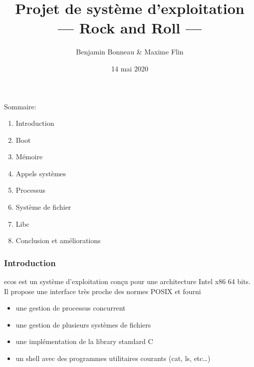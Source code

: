 \documentclass[10pt,a4paper]{beamer}
\author{Benjamin Bonneau \& Maxime Flin }
\title{Projet de système d'exploitation \\ --- Rock and Roll ---}
\date{14 mai 2020}
\begin{document}
\maketitle

\begin{frame}
  Sommaire:
  \begin{enumerate}
  \item Introduction
  \item Boot
  \item Mémoire
  \item Appels systèmes
  \item Processus
  \item Système de fichier
  \item Libc
  \item Conclusion et améliorations
  \end{enumerate}
\end{frame}

\begin{frame}
  \frametitle{Introduction}
  \textrm{ecos} est un système d'exploitation conçu pour une architecture Intel \textrm{x86} 64 bits. Il propose une interface très proche des normes \textrm{POSIX} et fourni
  \begin{itemize}
  \item une gestion de processus concurrent
  \item une gestion de plusieurs systèmes de fichiers
  \item une implémentation de la library standard C
  \item un shell avec des programmes utilitaires courants (\textrm{cat}, \textrm{ls}, etc\ldots)
  \end{itemize}
\end{frame}
\end{document}
